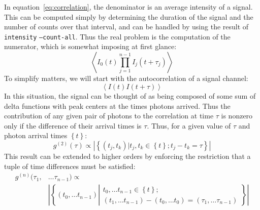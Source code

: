 \documentclass{article}
\newcommand{\braces}[1]{\ensuremath{\left\lbrace #1 \right\rbrace}}
\newcommand{\angles}[1]{\ensuremath{\left\langle #1 \right\rangle}}
\newcommand{\intensity}{\texttt{intensity}}
\newcommand{\gn}[1]{\ensuremath{g^{(#1)}}}
\begin{document}
In equation~\ref{eq:correlation}, the denominator is an average intensity of a signal. This can be computed simply by determining the duration of the signal and the number of counts over that interval, and can be handled by using the result of \intensity{} \texttt{--count-all}. Thus the real problem is the computation of the numerator, which is somewhat imposing at first glance:
\begin{equation}
\angles{I_{0}(t)\prod_{j=1}^{n-1}{I_{j}(t+\tau_{j})}}
\end{equation}
To simplify matters, we will start with the autocorrelation of a signal channel:
\begin{equation}
\angles{I(t)I(t+\tau)}
\end{equation}
In this situation, the signal can be thought of as being composed of some sum of delta functions with peak centers at the times photons arrived. Thus the contribution of any given pair of photons to the correlation at time $\tau$ is nonzero only if the difference of their arrival times is $\tau$. Thus, for a given value of $\tau$ and photon arrival times \braces{t}:
\begin{equation}
\gn{2}(\tau) \propto \left| \braces{(t_{j}, t_{k}) | t_{j},t_{k}\in\braces{t}; t_{j}-t_{k}=\tau} \right|
\end{equation}
This result can be extended to higher orders by enforcing the restriction that a tuple of time differences must be satisfied:
\begin{equation}
\begin{split}
\gn{n}(\tau_{1}, &\ldots \tau_{n-1}) \propto \\
   &\left| \braces{
       (t_{0}, \ldots t_{n-1})
       \left|\begin{split}
       t_{0},\ldots t_{n-1}\in\braces{t}; \\
       (t_{1}, \ldots t_{n-1}) - (t_{0}, \ldots t_{0}) = (\tau_{1}, \ldots \tau_{n-1})
       \end{split}\right.
%       
   } \right|
\end{split}
\end{equation}
\end{document}
